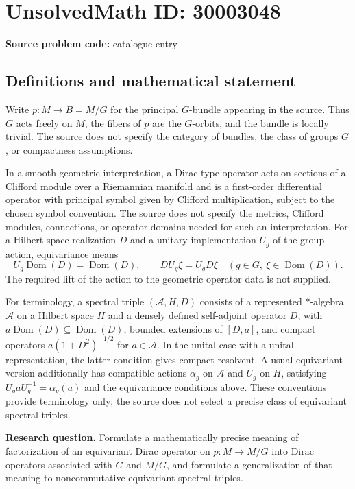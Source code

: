 \documentclass[11pt]{article}
\begin{document}
\section*{UnsolvedMath ID: 30003048}
\textbf{Source problem code:} catalogue entry
\subsection{Definitions and mathematical statement}
Write \(p\colon M\to B=M/G\) for the principal \(G\)-bundle appearing in the source. Thus \(G\) acts freely on \(M\), the fibers of \(p\) are the \(G\)-orbits, and the bundle is locally trivial. The source does not specify the category of bundles, the class of groups \(G\), or compactness assumptions.

In a smooth geometric interpretation, a Dirac-type operator acts on sections of a Clifford module over a Riemannian manifold and is a first-order differential operator with principal symbol given by Clifford multiplication, subject to the chosen symbol convention. The source does not specify the metrics, Clifford modules, connections, or operator domains needed for such an interpretation. For a Hilbert-space realization \(D\) and a unitary implementation \(U_g\) of the group action, equivariance means
\[
U_g\operatorname{Dom}(D)=\operatorname{Dom}(D),\qquad DU_g\xi=U_gD\xi
\quad(g\in G,\ \xi\in\operatorname{Dom}(D)).
\]
The required lift of the action to the geometric operator data is not supplied.

For terminology, a spectral triple \((\mathcal A,H,D)\) consists of a represented \(*\)-algebra \(\mathcal A\) on a Hilbert space \(H\) and a densely defined self-adjoint operator \(D\), with \(a\operatorname{Dom}(D)\subseteq\operatorname{Dom}(D)\), bounded extensions of \([D,a]\), and compact operators \(a(1+D^2)^{-1/2}\) for \(a\in\mathcal A\). In the unital case with a unital representation, the latter condition gives compact resolvent. A usual equivariant version additionally has compatible actions \(\alpha_g\) on \(\mathcal A\) and \(U_g\) on \(H\), satisfying \(U_gaU_g^{-1}=\alpha_g(a)\) and the equivariance conditions above. These conventions provide terminology only; the source does not select a precise class of equivariant spectral triples.

\textbf{Research question.} Formulate a mathematically precise meaning of factorization of an equivariant Dirac operator on \(p\colon M\to M/G\) into Dirac operators associated with \(G\) and \(M/G\), and formulate a generalization of that meaning to noncommutative equivariant spectral triples.
\end{document}
